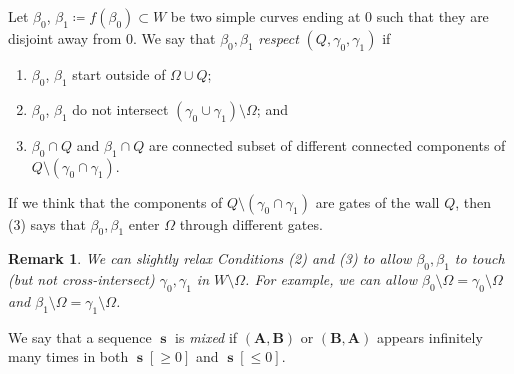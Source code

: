 \documentclass[]{amsart}
\newcommand\seq{{\operatorname{\mathbf s}}}
\newcommand{\A}{\mathbf A}
\newcommand{\B}{\mathbf B}
\newcommand\wall{{Q}}
\newcommand\inn{{\Omega}}
\newtheorem{rem}[thm]{Remark}
\theoremstyle{remark}
\numberwithin{equation}{section}
\theoremstyle{definition}
\begin{document}
Let  $\beta_0$, $\beta_1\coloneqq f(\beta_0)\subset W$ be two simple curves ending at $0$ such that they are disjoint away from $0$. We say that $\beta_0,\beta_1$ \emph{respect} $(\wall,\gamma_0,\gamma_1)$ if
\begin{enumerate}
\item $\beta_0$, $\beta_1$ start outside of $\inn\cup \wall$;
\item $\beta_0$, $\beta_1$ do not intersect $(\gamma_0\cup \gamma_1)\setminus \inn$; and
\item $\beta_0\cap \wall$ and $\beta_1\cap \wall$ are connected subset of different connected components of $\wall\setminus (\gamma_0\cap \gamma_1)$. 
\end{enumerate}
If we think that the components of $\wall\setminus (\gamma_0\cap \gamma_1)$ are gates of the wall $\wall$, then (3) says that $\beta_0,\beta_1$ enter $\inn$ through different gates. 





\begin{rem}
\label{rem:on dividing curves}
We can slightly relax Conditions (2) and (3) to allow $\beta_0,\beta_1$ to touch (but not cross-intersect) $\gamma_0,\gamma_1$ in $W\setminus \inn$. For example, we can allow $\beta_0\setminus \inn=\gamma_0\setminus\inn$ and $\beta_1\setminus \inn=\gamma_1\setminus \inn$. 
\end{rem}



We say that a sequence $\seq$ is \emph{mixed} if $(\A,\B)$ or $(\B,\A)$ appears infinitely many times in both $\seq[\ge 0]$ and $\seq[\le 0]$. 
\end{document}
